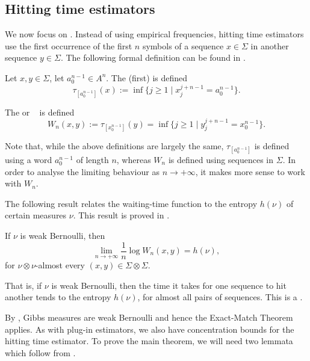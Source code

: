 \subsection{Hitting time estimators}\label{ssec:hitting-times}
We now focus on . Instead of using empirical frequencies, hitting time estimators use the first occurrence of the first $n$ symbols of a sequence $x \in \Sigma$ in another sequence $y \in \Sigma$. The following formal definition can be found in \cite[Definition 2.1]{chazottes-ugalde:hitting-times}.

\begin{definition}
	Let $x, y \in \Sigma$, let $a_0^{n - 1} \in A^n$. The (first)  is defined
	\[
		\tau_{[a_0^{n - 1}]}(x) := \inf\{j \geq 1 \mid x_j^{j + n - 1} = a_0^{n - 1}\}.
	\]
	
	The  or ~\cite[Section III.5]{shields:ergodic} is defined
	\[
		W_n(x, y) := \tau_{[x_0^{n - 1}]}(y) = \inf\{j \geq 1 \mid y_j^{j + n - 1} = x_0^{n - 1}\}.
	\]
\end{definition}

Note that, while the above definitions are largely the same, $\tau_{[a_0^{n - 1}]}$ is defined using a word $a_0^{n - 1}$ of length $n$, whereas $W_n$ is defined using sequences in $\Sigma$. In order to analyse the limiting behaviour as $n \to +\infty$, it makes more sense to work with $W_n$.

The following result relates the waiting-time function to the entropy $h(\nu)$ of certain measures $\nu$. This result is proved in \cite[Theorem III.5.1]{shields:ergodic}.

\begin{theorem} \label{thm:exact-match}
	If $\nu$ is weak Bernoulli, then
	\[
		\lim_{n \to +\infty}{\frac{1}{n}\log{W_n(x, y)}} = h(\nu),
	\]
	for $\nu \otimes \nu$-almost every $(x, y) \in \Sigma \otimes \Sigma$.
\end{theorem}

That is, if $\nu$ is weak Bernoulli, then the time it takes for one sequence to hit another tends to the entropy $h(\nu)$, for almost all pairs of sequences. This is a .

By , Gibbs measures are weak Bernoulli and hence the Exact-Match Theorem applies. As with plug-in estimators, we also have concentration bounds for the hitting time estimator. To prove the main theorem, we will need two lemmata which follow from \cite[Theorem 1]{abadi:sharp}.

